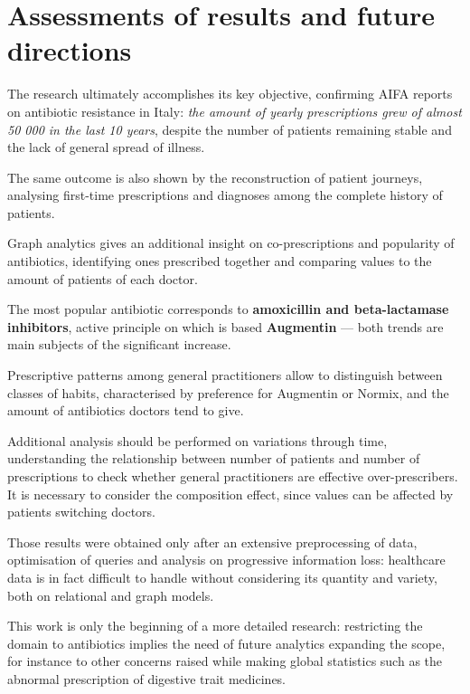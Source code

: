 \chapter{Assessments of results and future directions}

The research ultimately accomplishes its key objective, confirming AIFA reports on antibiotic resistance in Italy: \textit{the amount of yearly prescriptions grew of almost 50 000 in the last 10 years}, despite the number of patients remaining stable and the lack of general spread of illness. 

The same outcome is also shown by the reconstruction of patient journeys, analysing first-time prescriptions and diagnoses among the complete history of patients.

Graph analytics gives an additional insight on co-prescriptions and popularity of antibiotics, identifying ones prescribed together and comparing values to the amount of patients of each doctor.

The most popular antibiotic corresponds to \textbf{amoxicillin and beta-lactamase inhibitors}, active principle on which is based \textbf{Augmentin} --- both trends are main subjects of the significant increase.

Prescriptive patterns among general practitioners allow to distinguish between classes of habits, characterised by preference for Augmentin or Normix, and the amount of antibiotics doctors tend to give.

Additional analysis should be performed on variations through time, understanding the relationship between number of patients and number of prescriptions to check whether general practitioners are effective over-prescribers. It is necessary to consider the composition effect, since values can be affected by patients switching doctors.

Those results were obtained only after an extensive preprocessing of data, optimisation of queries and analysis on progressive information loss: healthcare data is in fact difficult to handle without considering its quantity and variety, both on relational and graph models.

This work is only the beginning of a more detailed research: restricting the domain to antibiotics implies the need of future analytics expanding the scope, for instance to other concerns raised while making global statistics such as the abnormal prescription of digestive trait medicines.
